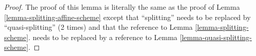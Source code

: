 \begin{proof}
The proof of this lemma is literally the same as the proof of
Lemma \ref{lemma-splitting-affine-scheme}
except that ``splitting'' needs to be replaced by ``quasi-splitting''
(2 times) and that the reference to
Lemma \ref{lemma-splitting-scheme}.
needs to be replaced by a reference to
Lemma \ref{lemma-quasi-splitting-scheme}.
\end{proof}








